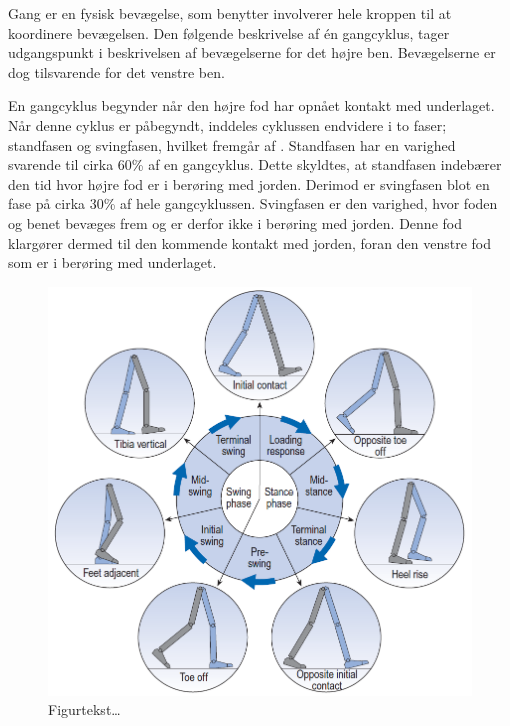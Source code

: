 Gang er en fysisk bevægelse, som benytter involverer hele kroppen til at koordinere bevægelsen. Den følgende beskrivelse af én gangcyklus, tager udgangspunkt i beskrivelsen af bevægelserne for det højre ben. Bevægelserne er dog tilsvarende for det venstre ben. \citep{VaughanDavisOConnor1992,Whittle1990}

En gangcyklus begynder når den højre fod har opnået kontakt med underlaget. Når denne cyklus er påbegyndt, inddeles cyklussen endvidere i to faser; standfasen og svingfasen, hvilket fremgår af . \newline
Standfasen har en varighed svarende til cirka 60\% af en gangcyklus. Dette skyldtes, at standfasen indebærer den tid hvor højre fod er i berøring med jorden. Derimod er svingfasen blot en fase på cirka 30\% af hele gangcyklussen. \citep{VaughanDavisOConnor1992} Svingfasen er den varighed, hvor foden og benet bevæges frem og er derfor ikke i berøring med jorden. Denne fod klargører dermed til den kommende kontakt med jorden, foran den venstre fod som er i berøring med underlaget.

\begin{figure}[H]
	\centering
	\includegraphics[scale=0.5]{figures/bProblemloesning/gang_cyklus2.png}
	\caption{Figurtekst…  \cite{VaughanDavisOConnor1992}}
	\label{fig:gang_cyklus}
\end{figure}

